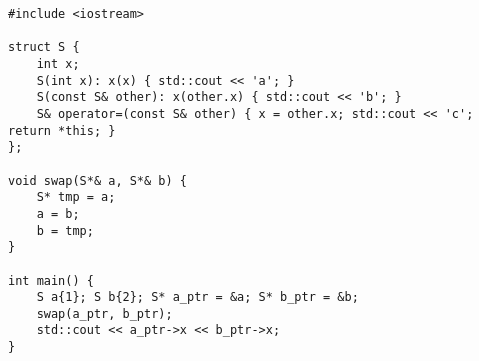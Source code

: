 \begin{lstlisting}[title=\href{https://godbolt.org/z/dEsxEY}{\texttt{godbolt.org/z/dEsxEY}}]
#include <iostream>

struct S { 
    int x;
    S(int x): x(x) { std::cout << 'a'; }
    S(const S& other): x(other.x) { std::cout << 'b'; }
    S& operator=(const S& other) { x = other.x; std::cout << 'c'; return *this; }
};

void swap(S*& a, S*& b) {
    S* tmp = a;
    a = b;
    b = tmp;
}

int main() {
    S a{1}; S b{2}; S* a_ptr = &a; S* b_ptr = &b;
    swap(a_ptr, b_ptr);
    std::cout << a_ptr->x << b_ptr->x;
}
\end{lstlisting}
